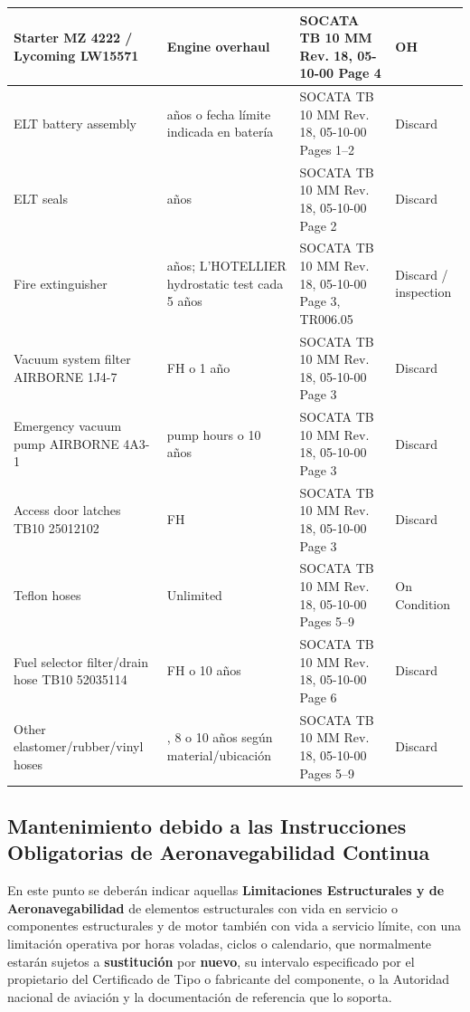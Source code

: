 \documentclass[12pt]{article}
\newcommand{\FH}{FH}
\begin{document}
\begin{longtable}{|>{\raggedright\arraybackslash}p{}|>{\raggedright\arraybackslash}p{}|>{\raggedright\arraybackslash}p{}|>{\raggedright\arraybackslash}p{}|}
\hline
Starter MZ 4222 / Lycoming LW15571 & Engine overhaul & SOCATA TB 10 MM Rev. 18, 05-10-00 Page 4 & OH \\
\hline
ELT battery assembly & 4 años o fecha límite indicada en batería & SOCATA TB 10 MM Rev. 18, 05-10-00 Pages 1--2 & Discard \\
\hline
ELT seals & 12 años & SOCATA TB 10 MM Rev. 18, 05-10-00 Page 2 & Discard \\
\hline
Fire extinguisher & 10 años; L'HOTELLIER hydrostatic test cada 5 años & SOCATA TB 10 MM Rev. 18, 05-10-00 Page 3, TR006.05 & Discard / inspection \\
\hline
Vacuum system filter AIRBORNE 1J4-7 & 500 \FH{} o 1 año & SOCATA TB 10 MM Rev. 18, 05-10-00 Page 3 & Discard \\
\hline
Emergency vacuum pump AIRBORNE 4A3-1 & 500 pump hours o 10 años & SOCATA TB 10 MM Rev. 18, 05-10-00 Page 3 & Discard \\
\hline
Access door latches TB10 25012102 & 1500 \FH & SOCATA TB 10 MM Rev. 18, 05-10-00 Page 3 & Discard \\
\hline
Teflon hoses & Unlimited & SOCATA TB 10 MM Rev. 18, 05-10-00 Pages 5--9 & On Condition \\
\hline
Fuel selector filter/drain hose TB10 52035114 & 2000 \FH{} o 10 años & SOCATA TB 10 MM Rev. 18, 05-10-00 Page 6 & Discard \\
\hline
Other elastomer/rubber/vinyl hoses & 5, 8 o 10 años según material/ubicación & SOCATA TB 10 MM Rev. 18, 05-10-00 Pages 5--9 & Discard \\
\hline
\end{longtable}
\endgroup

\subsection{Mantenimiento debido a las Instrucciones Obligatorias de Aeronavegabilidad Continua}
\label{subsec:ali-cmr}

En este punto se deberán indicar aquellas \textbf{Limitaciones Estructurales y de Aeronavegabilidad} de elementos estructurales con vida en servicio o componentes estructurales y de motor también con vida a servicio límite, con una limitación operativa por horas voladas, ciclos o calendario, que normalmente estarán sujetos a \textbf{sustitución} por \textbf{nuevo}, su intervalo especificado por el propietario del Certificado de Tipo o fabricante del componente, o la Autoridad nacional de aviación y la documentación de referencia que lo soporta.
\end{document}
